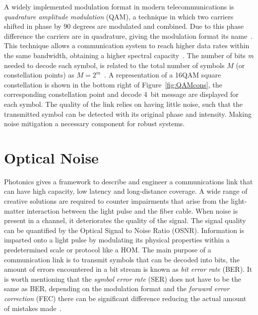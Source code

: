A widely implemented modulation format in modern telecommunications is \textit{quadrature amplitude modulation} (QAM), a technique in which two carriers shifted in phase by 90 degrees are modulated and combined. Due to this phase difference the carriers are in quadrature, giving the modulation format its name~\cite{benedetto1999principles}. This technique allows a communication system to reach higher data rates within the same bandwidth, obtaining a higher spectral capacity~\cite{webb1994modern}. The number of bits \emph{m} needed to decode each symbol, is related to the total number of symbols $M$ (or constellation points) as $M=2^{m}$~\cite{paik1994mode}.  A representation of a 16QAM square constellation is shown in the bottom right of Figure~\ref{fig:QAMcons}, the corresponding constellation point and decode 4~bit message are displayed for each symbol. The quality of the link relies on having little noise, such that the transmitted symbol can be detected with its original phase and intensity. Making noise mitigation a necessary component for robust systems. 
 
 
  
 \section{Optical Noise}
  
Photonics gives a framework to describe and engineer a communications link that can have high capacity, low latency and long-distance coverage. A wide range of creative solutions are required to counter impairments that arise from the light-matter interaction between the light pulse and the fiber cable. When noise is present in a channel, it deteriorates the quality of the signal. The signal quality can be quantified  by the Optical Signal to Noise Ratio (OSNR). Information is imparted onto a light pulse by modulating its physical properties within a predetermined scale or protocol like a HOM. The main purpose of a communication link is to transmit symbols that can be decoded into bits, the amount of errors encountered in a bit stream is known as \textit{bit error rate} (BER). It is worth mentioning that the \textit{symbol error rate} (SER) does not have to be the same as BER, depending on the modulation format and the \textit{forward error correction} (FEC) there can be significant difference reducing the actual amount of mistakes made~\cite{benedetto1999principles}. 


